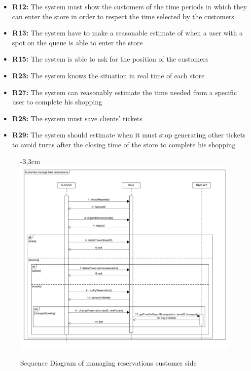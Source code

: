 \documentclass{article}
\begin{document}
\begin{center}
\begin{itemize}
						\item {\bfseries R12: } The system must show the customers of the time periods in which they can
						enter the store in order to respect the time selected by the customers
						\item {\bfseries R13: } The system have to make a reasonable estimate of when a user with a spot
						on the queue is able to enter the store
						\item {\bfseries R15: } The system is able to ask for the position of the customers
						\item {\bfseries R23: } The system knows the situation in real time of each store
						\item {\bfseries R27: } The system can reasonably estimate the time needed from a specific user
						to complete his shopping
						\item {\bfseries R28: } The system must save clients' tickets
						
						\item {\bfseries R29: } The system should estimate when it must stop generating other tickets to
						avoid turns after the closing time of the store
						to complete his shopping

						
						
					\end{itemize}
				

				\end{center}
			\newpage
			\begin{figure}[!htb]
				\begin{adjustwidth} {-3,3cm}{}
					\centering
					\includegraphics[scale=0.5]{SD/10_manageReservation(customer).pdf}\\
					\caption{Sequence Diagram of managing reservations customer side}
				\end{adjustwidth}
			\end{figure}
		\newpage
		
\end{document}
